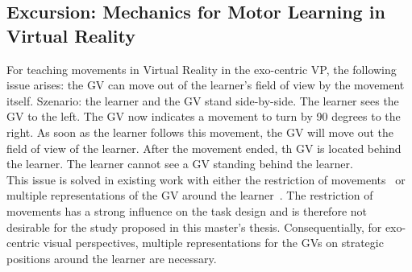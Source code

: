 \subsection{Excursion: Mechanics for Motor Learning in Virtual Reality}
For teaching movements in Virtual Reality in the exo-centric VP, the following issue arises: the GV can move out of the learner's field of view by the movement itself. Szenario: the learner and the GV stand side-by-side. The learner sees the GV to the left. The GV now indicates a movement to turn by 90 degrees to the right. As soon as the learner follows this movement, the GV will move out the field of view of the learner. After the movement ended, th GV is located behind the learner. The learner cannot see a GV standing behind the learner.\\
This issue is solved in existing work with either the restriction of movements~\cite{freethrowsimulator,elearningma} or multiple representations of the GV around the learner~\cite{thaichichua,mythaichicoaches}. The restriction of movements has a strong influence on the task design and is therefore not desirable for the study proposed in this master's thesis. Consequentially, for exo-centric visual perspectives, multiple representations for the GVs on strategic positions around the learner are necessary.\\

